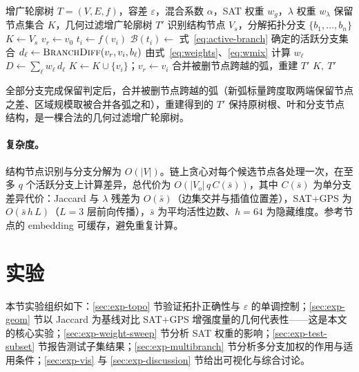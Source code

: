 \documentclass[twocolumn, a4paper, 10pt]{article}
\begin{document}
\begin{algorithm}[H]
\caption{基于多分支加权的贪心简化}
\label{alg:framework}
\begin{algorithmic}[1]
\Require 增广轮廓树 $T=(V,E,f)$，容差 $\varepsilon$，混合系数 $\alpha$，SAT 权重 $w_g$，$\lambda$ 权重 $w_\lambda$
\Ensure 保留节点集合 $K$，几何过滤增广轮廓树 $T'$
\State 识别结构节点 $V_s$，分解拓扑分支 $\{b_1,\ldots,b_n\}$
\State $K \gets V_s$
  \State $v_r \gets v_0$
    \State $t_i \gets f(v_i)$
    \State $\mathcal{B}(t_i) \gets$ 式~\eqref{eq:active-branch} 确定的活跃分支集合
      \State $d_\ell \gets \textsc{BranchDiff}(v_r,v_i,b_\ell)$ 
      \State 由式~\eqref{eq:weights}、\eqref{eq:wmix} 计算 $w_\ell$
    \EndFor
    \State $D \gets \sum_\ell w_\ell\, d_\ell$
      \State $K \gets K \cup \{v_i\}$；$v_r \gets v_i$
    \EndIf
  \EndFor
\EndFor
\State 合并被删节点跨越的弧，重建 $T'$
\State \Return $K,\ T'$
\end{algorithmic}
\end{algorithm}

全部分支完成保留判定后，合并被删节点跨越的弧（新弧标量跨度取两端保留节点之差、区域规模取被合并各弧之和），重建得到的 $T'$ 保持原树根、叶和分支节点结构，是一棵合法的几何过滤增广轮廓树。

\paragraph{复杂度。}结构节点识别与分支分解为 $O(|V|)$。链上贪心对每个候选节点各处理一次，在至多 $q$ 个活跃分支上计算差异，总代价为 $O(|V_o|\,q\,C(\bar{s}))$，其中 $C(\bar{s})$ 为单分支差异代价：Jaccard 与 $\lambda$ 残差为 $O(\bar{s})$（边集交并与插值位置差），SAT+GPS 为 $O(\bar{s}\,h\,L)$（$L{=}3$ 层前向传播），$\bar{s}$ 为平均活性边数、$h{=}64$ 为隐藏维度。参考节点的 embedding 可缓存，避免重复计算。

\section{实验}
\label{sec:experiments}

本节实验组织如下：\ref{sec:exp-topo} 节验证拓扑正确性与 $\varepsilon$ 的单调控制；\ref{sec:exp-geom} 节以 Jaccard 为基线对比 SAT+GPS 增强度量的几何代表性——这是本文的核心实验；\ref{sec:exp-weight-sweep} 节分析 SAT 权重的影响；\ref{sec:exp-test-subset} 节报告测试子集结果；\ref{sec:exp-multibranch} 节分析多分支加权的作用与适用条件；\ref{sec:exp-vis} 与 \ref{sec:exp-discussion} 节给出可视化与综合讨论。
\end{document}
